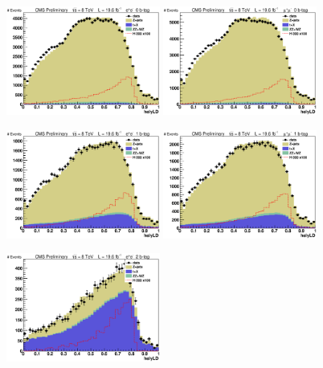 \begin{figure}[htb!]
\begin{center}
\centerline{
\includegraphics[width=0.45\textwidth]{presentation/defense/images/preselection/0/el/helyLD.eps}
\includegraphics[width=0.45\textwidth]{presentation/defense/images/preselection/0/mu/helyLD.eps}
}
\centerline{
\includegraphics[width=0.45\textwidth]{presentation/defense/images/preselection/1/el/helyLD.eps}
\includegraphics[width=0.45\textwidth]{presentation/defense/images/preselection/1/mu/helyLD.eps}
}
\centerline{
\includegraphics[width=0.45\textwidth]{presentation/defense/images/preselection/2/el/helyLD.eps}
}
\end{center}
\end{figure}
